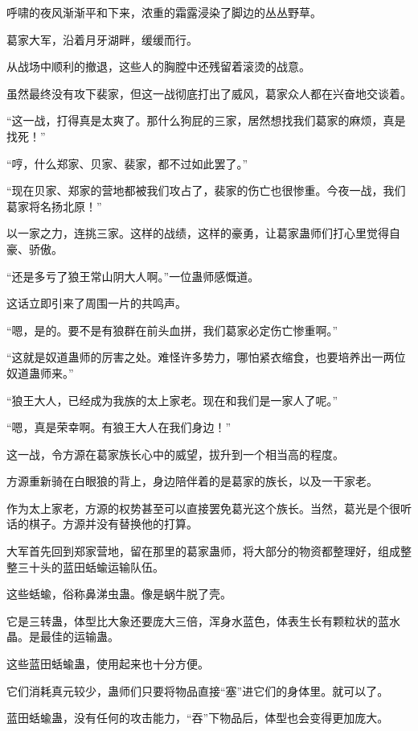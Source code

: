
\begin{this_body}

呼啸的夜风渐渐平和下来，浓重的霜露浸染了脚边的丛丛野草。

葛家大军，沿着月牙湖畔，缓缓而行。

从战场中顺利的撤退，这些人的胸膛中还残留着滚烫的战意。

虽然最终没有攻下裴家，但这一战彻底打出了威风，葛家众人都在兴奋地交谈着。

“这一战，打得真是太爽了。那什么狗屁的三家，居然想找我们葛家的麻烦，真是找死！”

“哼，什么郑家、贝家、裴家，都不过如此罢了。”

“现在贝家、郑家的营地都被我们攻占了，裴家的伤亡也很惨重。今夜一战，我们葛家将名扬北原！”

以一家之力，连挑三家。这样的战绩，这样的豪勇，让葛家蛊师们打心里觉得自豪、骄傲。

“还是多亏了狼王常山阴大人啊。”一位蛊师感慨道。

这话立即引来了周围一片的共鸣声。

“嗯，是的。要不是有狼群在前头血拼，我们葛家必定伤亡惨重啊。”

“这就是奴道蛊师的厉害之处。难怪许多势力，哪怕紧衣缩食，也要培养出一两位奴道蛊师来。”

“狼王大人，已经成为我族的太上家老。现在和我们是一家人了呢。”

“嗯，真是荣幸啊。有狼王大人在我们身边！”

这一战，令方源在葛家族长心中的威望，拔升到一个相当高的程度。

方源重新骑在白眼狼的背上，身边陪伴着的是葛家的族长，以及一干家老。

作为太上家老，方源的权势甚至可以直接罢免葛光这个族长。当然，葛光是个很听话的棋子。方源并没有替换他的打算。

大军首先回到郑家营地，留在那里的葛家蛊师，将大部分的物资都整理好，组成整整三十头的蓝田蛞蝓运输队伍。

这些蛞蝓，俗称鼻涕虫蛊。像是蜗牛脱了壳。

它是三转蛊，体型比大象还要庞大三倍，浑身水蓝色，体表生长有颗粒状的蓝水晶。是最佳的运输蛊。

这些蓝田蛞蝓蛊，使用起来也十分方便。

它们消耗真元较少，蛊师们只要将物品直接“塞”进它们的身体里。就可以了。

蓝田蛞蝓蛊，没有任何的攻击能力，“吞”下物品后，体型也会变得更加庞大。


\end{this_body}
